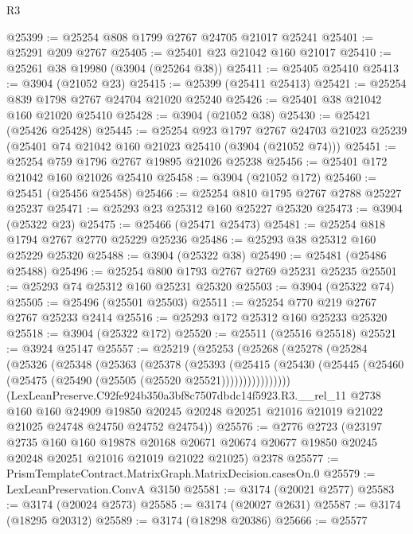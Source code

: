 \begin{lexlean}{R3}
\begin{coremodule}
@25399 := @25254 @808 @1799 @2767 @24705 @21017 @25241
@25401 := @25291 @209 @2767
@25405 := @25401 @23 @21042 @160 @21017
@25410 := @25261 @38 @19980 (@3904 (@25264 @38))
@25411 := @25405 @25410
@25413 := @3904 (@21052 @23)
@25415 := @25399 (@25411 @25413)
@25421 := @25254 @839 @1798 @2767 @24704 @21020 @25240
@25426 := @25401 @38 @21042 @160 @21020 @25410
@25428 := @3904 (@21052 @38)
@25430 := @25421 (@25426 @25428)
@25445 := @25254
    @923
    @1797
    @2767
    @24703
    @21023
    @25239
    (@25401 @74 @21042 @160 @21023 @25410 (@3904 (@21052 @74)))
@25451 := @25254 @759 @1796 @2767 @19895 @21026 @25238
@25456 := @25401 @172 @21042 @160 @21026 @25410
@25458 := @3904 (@21052 @172)
@25460 := @25451 (@25456 @25458)
@25466 := @25254 @810 @1795 @2767 @2788 @25227 @25237
@25471 := @25293 @23 @25312 @160 @25227 @25320
@25473 := @3904 (@25322 @23)
@25475 := @25466 (@25471 @25473)
@25481 := @25254 @818 @1794 @2767 @2770 @25229 @25236
@25486 := @25293 @38 @25312 @160 @25229 @25320
@25488 := @3904 (@25322 @38)
@25490 := @25481 (@25486 @25488)
@25496 := @25254 @800 @1793 @2767 @2769 @25231 @25235
@25501 := @25293 @74 @25312 @160 @25231 @25320
@25503 := @3904 (@25322 @74)
@25505 := @25496 (@25501 @25503)
@25511 := @25254 @770 @219 @2767 @2767 @25233 @2414
@25516 := @25293 @172 @25312 @160 @25233 @25320
@25518 := @3904 (@25322 @172)
@25520 := @25511 (@25516 @25518)
@25521 := @3924 @25147
@25557 := @25219
    (@25253
      (@25268
        (@25278
          (@25284
            (@25326
              (@25348
                (@25363
                  (@25378
                    (@25393
                      (@25415
                        (@25430
                          (@25445 (@25460 (@25475 (@25490 (@25505 (@25520 @25521))))))))))))))))
      (LexLeanPreserve.C92fe924b350a3bf8c7507dbdc14f5923.R3.__rel_11
        @2738
        @160
        @160
        @24909
        @19850
        @20245
        @20248
        @20251
        @21016
        @21019
        @21022
        @21025
        @24748
        @24750
        @24752
        @24754))
@25576 := @2776
    @2723
    (@23197
      @2735
      @160
      @160
      @19878
      @20168
      @20671
      @20674
      @20677
      @19850
      @20245
      @20248
      @20251
      @21016
      @21019
      @21022
      @21025)
    @2378
@25577 := PrismTemplateContract.MatrixGraph.MatrixDecision.casesOn.{0}
@25579 := LexLeanPreservation.ConvA @3150
@25581 := @3174 (@20021 @2577)
@25583 := @3174 (@20024 @2573)
@25585 := @3174 (@20027 @2631)
@25587 := @3174 (@18295 @20312)
@25589 := @3174 (@18298 @20386)
@25666 := @25577

\end{coremodule}
\end{lexlean}
